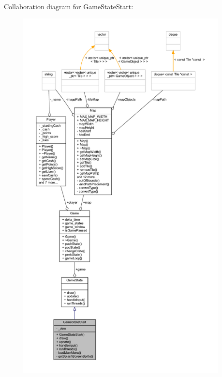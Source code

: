 Collaboration diagram for Game\+State\+Start\+:\nopagebreak
\begin{figure}[H]
\begin{center}
\leavevmode
\includegraphics[height=550pt]{class_game_state_start__coll__graph}
\end{center}
\end{figure}
